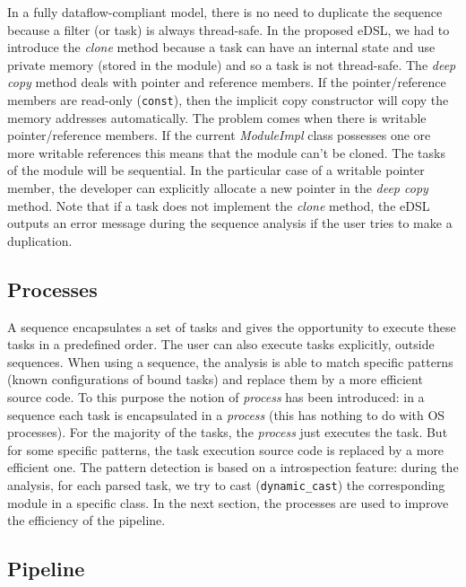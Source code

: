 In a fully dataflow-compliant model, there is no need to duplicate the sequence
because a filter (or task) is always thread-safe. In the proposed eDSL, we had
to introduce the \emph{clone} method because a task can have an internal state
and use private memory (stored in the module) and so a task is not thread-safe.
The \emph{deep copy} method deals with pointer and reference members. If the
pointer/reference members are read-only (\verb|const|), then the implicit copy
constructor will copy the memory addresses automatically. The problem comes
when there is writable pointer/reference members. If the current
\emph{ModuleImpl} class possesses one ore more writable references this means
that the module can't be cloned. The tasks of the module will be sequential. In
the particular case of a writable pointer member, the developer can explicitly
allocate a new pointer in the \emph{deep copy} method. Note that if a task does
not implement the \emph{clone} method, the eDSL outputs an error message during
the sequence analysis if the user tries to make a duplication.

\subsection{Processes}

A sequence encapsulates a set of tasks and gives the opportunity to execute
these tasks in a predefined order. The user can also execute tasks explicitly,
outside sequences. When using a sequence, the analysis is able to match specific
patterns (known configurations of bound tasks) and replace them by a more
efficient source code. To this purpose the notion of \emph{process} has been
introduced: in a sequence each task is encapsulated in a \emph{process} (this
has nothing to do with OS processes). For the majority of the tasks, the
\emph{process} just executes the task. But for some specific patterns, the task
execution source code is replaced by a more efficient one. The pattern detection
is based on a \Cxx introspection feature: during the analysis, for each parsed
task, we try to cast (\verb|dynamic_cast|) the corresponding module in a
specific class. In the next section, the processes are used to improve the
efficiency of the pipeline.

\subsection{Pipeline}

